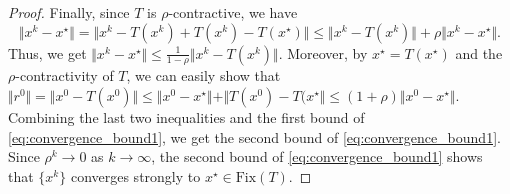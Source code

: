 \documentclass[10pt,a4paper]{amsart}
\newcommand{\norms}[1]{\Vert#1\Vert}
\newcommand{\sets}[1]{\{#1\}}
\begin{document}
\begin{proof}
Finally, since $T$ is $\rho$-contractive, we have  
 \begin{equation*}
     \norms{ x^k - x^{\star} }  = \norms{ x^k - T(x^k) + T(x^k) - T(x^{\star}) } \leq \norms{ x^k - T(x^k) } + \rho \norms{ x^k - x^{\star} }.
 \end{equation*}
 Thus, we get $\norms{ x^k - x^{\star} }  \leq \frac{1}{1-\rho} \norms{ x^k - T(x^k)}$. 
 Moreover, by $x^{\star} = T(x^{\star})$ and  the $\rho$-contractivity of $T$, we can easily show that $\norms{r^0} = \norms{x^0 - T(x^0)} \leq \norms{x^0 - x^{\star}} + \norms{T(x^0) - T(x^{\star}} \leq (1+\rho)\norms{x^0 - x^{\star}}$.
Combining the last two inequalities and the first bound of  \eqref{eq:convergence_bound1}, we get the second bound of  \eqref{eq:convergence_bound1}.
Since $\rho^k \to 0$ as $k \to \infty$, the second bound of  \eqref{eq:convergence_bound1} shows that $\sets{x^k}$ converges strongly to $x^{\star} \in \mathrm{Fix}(T)$.
\end{proof}
\end{document}
